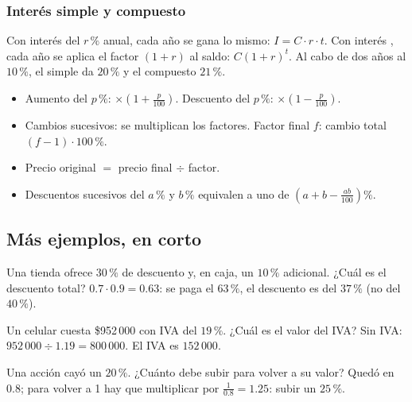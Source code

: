 
\subsubsection{Interés simple y compuesto}
Con interés  del $r\,\%$ anual, cada año se gana lo mismo: $I = C \cdot r \cdot t$. Con interés
, cada año se aplica el factor $(1 + r)$ al saldo: $C (1 + r)^t$. Al cabo de dos años al $10\,\%$,
el simple da $20\,\%$ y el compuesto $21\,\%$.

\begin{regla}
\begin{itemize}
  \item Aumento del $p\,\%$: $\times\left(1 + \tfrac{p}{100}\right)$. Descuento del $p\,\%$: $\times\left(1 - \tfrac{p}{100}\right)$.
  \item Cambios sucesivos: se multiplican los factores. Factor final $f$: cambio total $(f - 1)\cdot 100\,\%$.
  \item Precio original $=$ precio final $\div$ factor.
  \item Descuentos sucesivos del $a\,\%$ y $b\,\%$ equivalen a uno de $\left(a + b - \tfrac{ab}{100}\right)\%$.
\end{itemize}
\end{regla}

\subsection{Más ejemplos, en corto}
\begin{ejemplo}
Una tienda ofrece $30\,\%$ de descuento y, en caja, un $10\,\%$ adicional. ¿Cuál es el descuento total?
\solucion $0.7 \cdot 0.9 = 0.63$: se paga el $63\,\%$, el descuento es del $37\,\%$ (no del $40\,\%$).
\end{ejemplo}

\begin{ejemplo}
Un celular cuesta \$952\,000 con IVA del $19\,\%$. ¿Cuál es el valor del IVA?
\solucion Sin IVA: $952\,000 \div 1.19 = 800\,000$. El IVA es $152\,000$.
\end{ejemplo}

\begin{ejemplo}
Una acción cayó un $20\,\%$. ¿Cuánto debe subir para volver a su valor?
\solucion Quedó en $0.8$; para volver a 1 hay que multiplicar por $\tfrac{1}{0.8} = 1.25$: subir un $25\,\%$.
\end{ejemplo}

